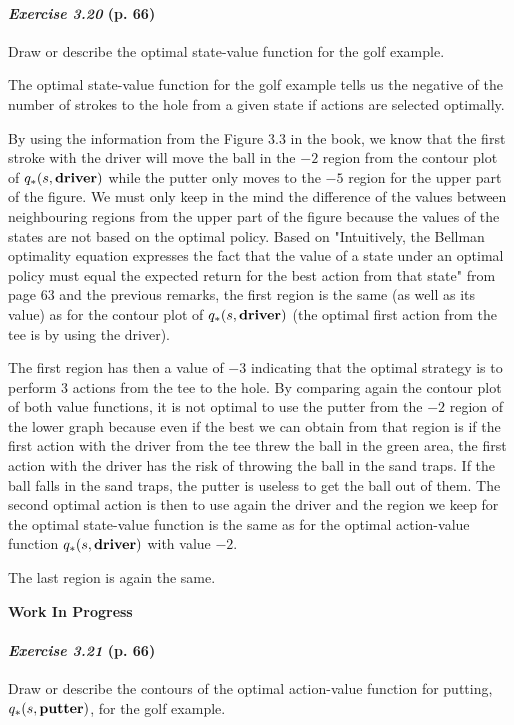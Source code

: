 \documentclass[10pt,a4paper]{article}
\begin{document}
\paragraph{\textit{Exercise 3.20} (p. 66)} 
Draw or describe the optimal state-value function for the golf example.

\bigskip
The optimal state-value function for the golf example tells us the negative of
the number of strokes to the hole from a given state if actions are selected optimally.


By using the information from the Figure $3.3$ in the book, we know that the first stroke with the driver will move the ball in the $-2$ region from the contour plot of $q_*(s, \textrm{\textbf{driver}})$ while the putter only moves to the $-5$ region for the upper part of the figure. We must only keep in the mind the difference of the values between neighbouring regions from the upper part of the figure because the values of the states are not based on the optimal policy. Based on "Intuitively, the Bellman optimality equation expresses the
fact that the value of a state under an optimal policy must equal the expected return for
the best action from that state" from page $63$ and the previous remarks, the first region is the same (as well as its value) as for the contour plot of $q_*(s, \textrm{\textbf{driver}})$ (the optimal first action from the tee is by using the driver).

The first region has then a value of $-3$ indicating that the optimal strategy is to perform $3$ actions from the tee to the hole. By comparing again the contour plot of both value functions, it is not optimal to use the putter from the $-2$ region of the lower graph because even if the best we can obtain from that region is if the first action with the driver from the tee threw the ball in the green area, the first action with the driver has the risk of throwing the ball in the sand traps. If the ball falls in the sand traps, the putter is useless to get the ball out of them. The second optimal action is then to use again the driver and the region we keep for the optimal state-value function is the same as for the optimal action-value function $q_*(s, \textrm{\textbf{driver}})$ with value $-2$.

The last region is again the same.

\textbf{Work In Progress}

\paragraph{\textit{Exercise 3.21} (p. 66)} 
Draw or describe the contours of the optimal action-value function for
putting, $q_*(s, \textrm{\textbf{putter}})$, for the golf example.
\end{document}
